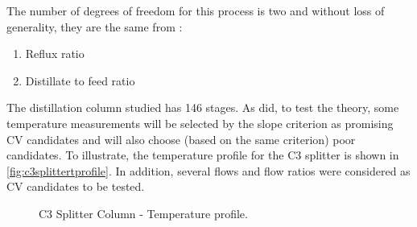 \documentclass[../../msc-thesis.tex]{subfiles}
\begin{document}
The number of degrees of freedom for this process is two 
\cite{Alves2018,Skogestad2000} and without loss of generality, they are the 
same from \textcite{Alves2018}:

\begin{enumerate}
    \item Reflux ratio
    \item Distillate to feed ratio
\end{enumerate}

The distillation column studied has 146 stages. As \textcite{Alves2018} did, 
to test the \soc theory, some temperature measurements will be selected by the 
slope criterion \cite{Luyben2006} as promising CV candidates and will also 
choose (based on the same criterion) poor candidates. To illustrate, 
the temperature profile for the C3 splitter is shown in 
\autoref{fig:c3splittertprofile}. In addition, several flows and flow ratios 
were considered as CV candidates to be tested.

\begin{figure}[htb]
    \centering
    \caption{C3 Splitter Column - Temperature profile.}
    \label{fig:c3splittertprofile}
\end{figure}
\end{document}
